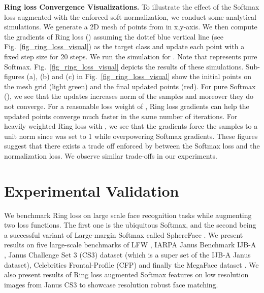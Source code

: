 \documentclass[10pt,twocolumn,letterpaper]{article}
\begin{document}
\textbf{Ring loss Convergence Visualizations.} To illustrate the effect of the Softmax loss augmented with the enforced soft-normalization, we conduct some analytical simulations. We generate a 2D mesh of points from  in x,y-axis. We then compute the gradients of Ring loss () assuming the dottef blue vertical line (see Fig.~\ref{fig_ring_loss_visual}) as the target class and update each point with a fixed step size for 20 steps. We run the simulation for . Note that  represents pure Softmax. Fig.~\ref{fig_ring_loss_visual} depicts the results of these simulations.  Sub-figures (a), (b) and (c)  in Fig.~\ref{fig_ring_loss_visual} show the initial points on the mesh grid (light green) and the final updated points (red). For pure Softmax (), we see that the updates increases norm of the samples and moreover they do not converge. For a reasonable loss weight of , Ring loss gradients can help the updated points converge much faster in the same number of iterations. For heavily weighted Ring loss with , we see that the gradients force the samples to a unit norm since  was set to 1 while overpowering Softmax gradients. These figures suggest that there exists a trade off enforced by  between the Softmax loss  and the normalization loss. We observe similar trade-offs in our experiments.\\








\section{Experimental Validation}






We benchmark Ring loss on large scale face recognition tasks while augmenting two loss functions. The first one is the ubiquitous Softmax, and the second being a successful variant of Large-margin Softmax \cite{liu2016large} called SphereFace \cite{liu2017sphereface}.  We present results on five large-scale benchmarks of LFW \cite{LFWTech}, IARPA Janus Benchmark IJB-A   \cite{klare2015pushing}, Janus Challenge Set 3 (CS3) dataset (which is a super set of the IJB-A Janus dataset), Celebrities Frontal-Profile (CFP) \cite{sengupta2016frontal} and finally the MegaFace dataset \cite{kemelmacher2016megaface}. We also present results of Ring loss augmented Softmax features on low resolution images from Janus CS3 to showcase resolution robust face matching.
\end{document}
